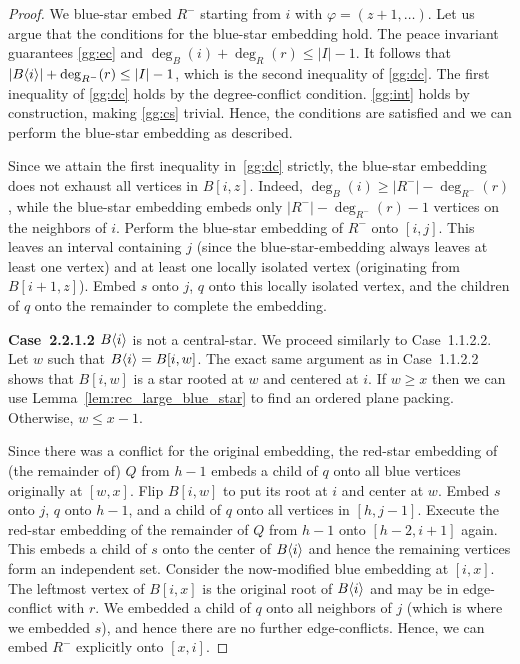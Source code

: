 \documentclass[11pt,a4paper,colorlinks=true,urlcolor=blue,citecolor=red]{article}
\theoremstyle{plain}
\newcommand{\case}[1]{\par\vspace{.5\baselineskip}\noindent\textbf{\sffamily Case~#1}}
\begin{document}
\begin{proof}
  We blue-star embed $R^-$ starting from $i$ with
  $\varphi=(z+1,\ldots)$. Let us argue that the conditions for the
  blue-star embedding hold. The peace invariant guarantees \ref{gg:ec}
  and $\deg_B(i)+\deg_R(r)\leq |I|-1$. It follows that
  $|B\langle{i}\rangle|+\deg_{R^-}(r)\leq |I|-1$, which is the second inequality
  of \ref{gg:dc}. The first inequality of \ref{gg:dc} holds by the
  degree-conflict condition. \ref{gg:int} holds by construction, making
  \ref{gg:cs} trivial.  Hence, the conditions are satisfied and we can
  perform the blue-star embedding as described.

  Since we attain the first inequality in~\ref{gg:dc} strictly, the
  blue-star embedding does not exhaust all vertices in $B[i,z]$. Indeed,
  $\deg_B(i)\geq |R^-|-\deg_{R^-}(r)$, while the blue-star embedding
  embeds only $|R^-|-\deg_{R^-}(r)-1$ vertices on the neighbors of $i$.
  Perform the blue-star embedding of $R^-$ onto $[i,j]$. This leaves an
  interval containing $j$ (since the blue-star-embedding always leaves
  at least one vertex) and at least one locally isolated vertex
  (originating from $B[i+1,z]$). Embed $s$ onto $j$, $q$ onto this
  locally isolated vertex, and the children of $q$ onto the remainder to
  complete the embedding.

  \case{2.2.1.2} $B\langle{i}\rangle$ is not a central-star. We proceed
  similarly to Case~1.1.2.2. Let $w$ such that $B\langle{i}\rangle=B[i,w]$. The
  exact same argument as in Case~1.1.2.2 shows that $B[i,w]$ is a star
  rooted at $w$ and centered at $i$. If $w\geq x$ then we can use
  Lemma~\ref{lem:rec_large_blue_star} to find an ordered plane packing.
  Otherwise, $w\leq x-1$.

  Since there was a conflict for the original embedding, the red-star
  embedding of (the remainder of) $Q$ from $h-1$ embeds a child of $q$
  onto all blue vertices originally at $[w,x]$. Flip $B[i,w]$ to put its
  root at $i$ and center at $w$. Embed $s$ onto $j$, $q$ onto $h-1$, and
  a child of $q$ onto all vertices in $[h,j-1]$.  Execute the red-star
  embedding of the remainder of $Q$ from $h-1$ onto $[h-2,i+1]$
  again. This embeds a child of $s$ onto the center of $B\langle{i}\rangle$ and
  hence the remaining vertices form an independent set. Consider the
  now-modified blue embedding at $[i,x]$.  The leftmost vertex of
  $B[i,x]$ is the original root of $B\langle{i}\rangle$ and may be in
  edge-conflict with $r$. We embedded a child of $q$ onto all neighbors
  of $j$ (which is where we embedded $s$), and hence there are no
  further edge-conflicts. Hence, we can embed $R^-$ explicitly onto
  $[x,i]$.


\end{proof}
\end{document}
